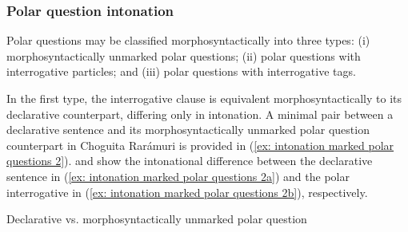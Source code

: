 
\subsubsection{Polar question intonation}
\label{subsubsec: polar question intonation}

Polar questions may be classified morphosyntactically into three types: (i) morphosyntactically unmarked polar questions; (ii) polar questions with interrogative particles; and (iii) polar questions with interrogative tags.

In the first type, the interrogative clause is equivalent morphosyntactically to its declarative counterpart, differing only in intonation. A minimal pair between a declarative sentence and its morphosyntactically unmarked polar question counterpart in Choguita Rarámuri is provided in (\ref{ex: intonation marked polar questions 2}).  and  show the intonational difference between the declarative sentence in (\ref{ex: intonation marked polar questions 2a}) and the polar interrogative in (\ref{ex: intonation marked polar questions 2b}), respectively.

\ea\label{ex: intonation marked polar questions 2}
{Declarative vs. morphosyntactically unmarked polar question}

    \label{ex: intonation marked polar questions 2a}
        \label{ex: intonation marked polar questions 2b}
    \z
\z

